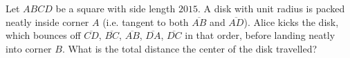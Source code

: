 Let $ABCD$ be a square with side length $2015$.
A disk with unit radius is packed neatly inside corner $A$ (i.e. tangent to both $\overline{AB}$ and $\overline{AD}$).
Alice kicks the disk, which bounces off $\overline{CD}$, $\overline{BC}$, $\overline{AB}$, $\overline{DA}$, $\overline{DC}$ in that order, before landing neatly into corner $B$. What is the total distance the center of the disk travelled?
